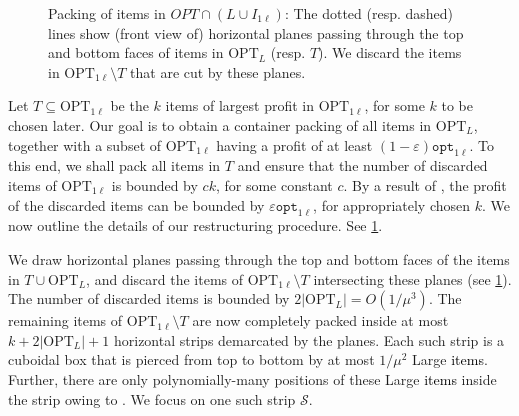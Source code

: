 \documentclass[10pt,a4paper]{amsart}
\newcommand{\kvnnew}[1]{\textcolor{black}{#1}}
\renewcommand{\epsilon}{\varepsilon} %
\newcommand{\SM}{\mathcal{S}}
\theoremstyle{definition}
\newcommand{\hmax}{\mu}
\newcommand{\optonel}{\mathtt{opt}_{1\ell}}
\newcommand{\OPTonel}{\text{OPT}_{1\ell}}
\newcommand{\OPTL}{\text{OPT}_L}
\begin{document}
\begin{figure}
    \centering
    
    \caption{Packing of items in $OPT \cap (L\cup I_{1\ell})$: The dotted (resp. dashed) lines show (front view of) horizontal planes passing through the top and bottom faces of items in $\OPTL$ (resp.  $T$). We discard the items in $\OPTonel \setminus T$ that are cut by these planes.}
    \label{fig:Planes cutting}
\end{figure}

Let $T\subseteq \OPTonel$ be the $k$ items of largest profit in $\OPTonel$, for some $k$ to be chosen later. Our goal is to obtain a container packing of all items in $\OPTL$, together with a subset of $\OPTonel$ having a profit of at least $(1-\epsilon)\optonel$. To this end, we shall pack all items in $T$ and ensure that the number of discarded items of $\OPTonel$ is bounded by $ck$, for some constant $c$. By a result of \cite{jansen1999improved}, the profit of the discarded items can be bounded by $\epsilon \optonel$, for appropriately chosen $k$. We now outline the details of our restructuring procedure. See \cref{fig:Planes cutting}.

We draw horizontal planes passing through the top and bottom faces of the items in $T\cup \OPTL$, and discard the items of $\OPTonel \setminus T$  intersecting these planes (see \cref{fig:Planes cutting}). The number of discarded items is bounded by $2|\OPTL|=O(1/\mu^3)$. The remaining items of $\OPTonel\setminus T$ are now completely packed inside at most $k+2|\OPTL|+1$ horizontal strips demarcated by the planes. Each such strip is a cuboidal box that is pierced from top to bottom by at most $1/\hmax^2$ Large \kvnnew{items}. Further, there are only polynomially-many positions of these Large \kvnnew{items} inside the strip owing to . We focus on one such strip $\SM$.
\end{document}
